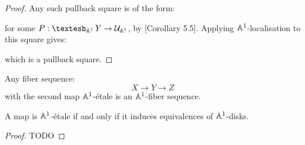 \begin{proof}
Any such pullback square is of the form:
  \begin{center}
  \end{center}
for some $P: \shape_{\A^1}Y \to {\mathcal U}_{\A^1}$, by \cite{cherubini_rijke_2021}[Corollary 5.5]. Applying $\mathbb{A}^1$-localisation to this square gives:
  \begin{center}
  \end{center}
  which is a pullback square.
\end{proof}

\begin{corollary}
Any fiber sequence:
\[X\to Y\to Z\]
with the second map $\mathbb{A}^1$-étale is an $\mathbb{A}^1$-fiber sequence.
\end{corollary}

\begin{lemma}
A map is $\mathbb{A}^1$-étale if and only if it induces equivalences of $\mathbb{A}^1$-disks. 
\end{lemma}

\begin{proof}
TODO
\end{proof}